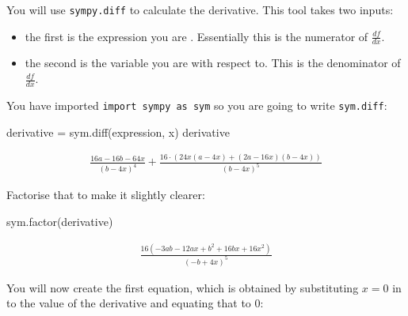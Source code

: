 You will use \texttt{sympy.diff} to calculate the derivative. This tool takes two inputs:
\begin{itemize}
\item 

the first is the expression you are . Essentially this is the numerator of \(\frac{df}{dx}\).

\item 

the second is the variable you are  with respect to. This is the denominator of \(\frac{df}{dx}\).

\end{itemize}



You have imported \texttt{import sympy as sym} so you are going to write \texttt{sym.diff}:





\begin{pyin}
derivative = sym.diff(expression, x)
derivative
\end{pyin}




\begin{equation*}
\begin{split}\displaystyle \frac{16 a - 16 b - 64 x}{\left(b - 4 x\right)^{4}} + \frac{16 \cdot \left(24 x \left(a - 4 x\right) + \left(2 a - 16 x\right) \left(b - 4 x\right)\right)}{\left(b - 4 x\right)^{5}}\end{split}
\end{equation*}




Factorise that to make it slightly clearer:




\begin{pyin}
sym.factor(derivative)
\end{pyin}




\begin{equation*}
\begin{split}\displaystyle \frac{16 \left(- 3 a b - 12 a x + b^{2} + 16 b x + 16 x^{2}\right)}{\left(- b + 4 x\right)^{5}}\end{split}
\end{equation*}

You will now create the first equation, which is obtained by substituting \(x=0\)
in to the value of the derivative and equating that to \(0\):




